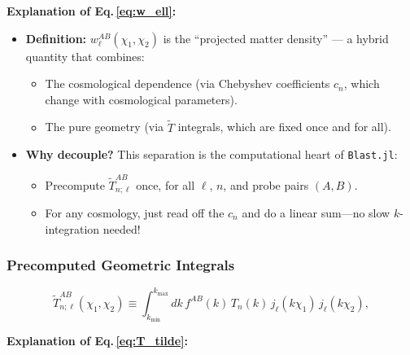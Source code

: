 \noindent\textbf{\large Explanation of Eq.\,\eqref{eq:w_ell}:}\\

\begin{itemize}[leftmargin=1.5cm]
    \item \textbf{Definition:} $w^{AB}_\ell(\chi_1,\chi_2)$ is the ``projected matter density'' — a hybrid quantity that combines:
    \begin{itemize}
        \item The cosmological dependence (via Chebyshev coefficients $c_n$, which change with cosmological parameters).
        \item The pure geometry (via $\tilde{T}$ integrals, which are fixed once and for all).
    \end{itemize}
    
    \item \textbf{Why decouple?} This separation is the computational heart of \texttt{Blast.jl}:
    \begin{itemize}
        \item Precompute $\tilde{T}^{AB}_{n;\ell}$ once, for all $\ell$, $n$, and probe pairs $(A,B)$.
        \item For any cosmology, just read off the $c_n$ and do a linear sum—no slow $k$-integration needed!
    \end{itemize}
\end{itemize}

\subsubsection{Precomputed Geometric Integrals}

\begin{equation}
    \tilde{T}^{AB}_{n;\ell}(\chi_1,\chi_2) \equiv
    \int_{k_{\min}}^{k_{\max}} dk\, f^{AB}(k)\,T_n(k)\,
    j_\ell(k\chi_1)\,j_\ell(k\chi_2),
    \label{eq:T_tilde}
\end{equation}

\noindent\textbf{\large Explanation of Eq.\,\eqref{eq:T_tilde}:}\\

